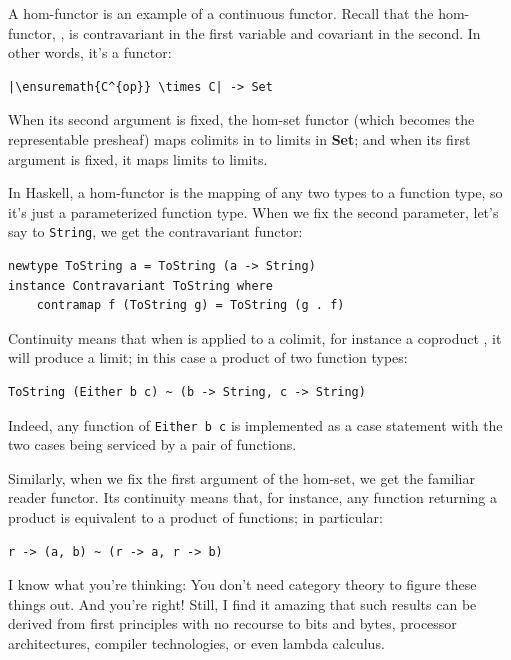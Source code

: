 A hom-functor is an example of a continuous functor. Recall that the
hom-functor, , is contravariant in the first variable
and covariant in the second. In other words, it's a functor:

\begin{verbatim}
|\ensuremath{C^{op}} \times C| -> Set
\end{verbatim}

When its second argument is fixed, the hom-set functor (which becomes
the representable presheaf) maps colimits in  to limits in
\textbf{Set}; and when its first argument is fixed, it maps limits to
limits.

In Haskell, a hom-functor is the mapping of any two types to a function
type, so it's just a parameterized function type. When we fix the second
parameter, let's say to \texttt{String}, we get the contravariant
functor:

\begin{verbatim}
newtype ToString a = ToString (a -> String) 
instance Contravariant ToString where 
    contramap f (ToString g) = ToString (g . f)
\end{verbatim}

Continuity means that when  is applied to a colimit,
for instance a coproduct , it will produce a limit;
in this case a product of two function types:

\begin{verbatim}
ToString (Either b c) ~ (b -> String, c -> String)
\end{verbatim}

Indeed, any function of \texttt{Either\ b\ c} is implemented as a case
statement with the two cases being serviced by a pair of functions.

Similarly, when we fix the first argument of the hom-set, we get the
familiar reader functor. Its continuity means that, for instance, any
function returning a product is equivalent to a product of functions; in
particular:

\begin{verbatim}
r -> (a, b) ~ (r -> a, r -> b)
\end{verbatim}

I know what you're thinking: You don't need category theory to figure
these things out. And you're right! Still, I find it amazing that such
results can be derived from first principles with no recourse to bits
and bytes, processor architectures, compiler technologies, or even
lambda calculus.


